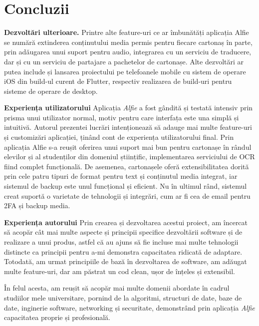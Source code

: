\chapter{Concluzii}

\textbf{Dezvoltări ulterioare.} Printre alte feature-uri ce ar îmbunătăți aplicația Alfie se numără extinderea conținutului media permis pentru fiecare cartonaș în parte, prin adăugarea unui suport pentru audio, integrarea cu un serviciu de traducere, dar și cu un serviciu de partajare a pachetelor de cartonașe. Alte dezvoltări ar putea include și lansarea proiectului pe telefoanele mobile cu sistem de operare iOS din build-ul curent de Flutter, respectiv realizarea de build-uri pentru sisteme de operare de desktop.

\textbf{Experiența utilizatorului} Aplicația \textit{Alfie} a fost gândită și testată intensiv prin prisma unui utilizator normal, motiv pentru care interfața este una simplă și intuitivă. Autorul prezentei lucrări intenționează să adauge mai multe feature-uri și customizări aplicației, ținând cont de experiența utilizatorului final. Prin aplicația Alfie s-a reușit oferirea unui suport mai bun pentru cartonașe în rândul elevilor și al studenților din domeniul științific, implementarea serviciului de OCR fiind complet funcțională. De asemenea, cartonașele oferă extensibilitatea dorită prin cele patru tipuri de format pentru text și conținutul media integrat, iar sistemul de backup este unul funcțional și eficient. Nu în ultimul rând, sistemul creat suportă o varietate de tehnologii și integrări, cum ar fi cea de email pentru 2FA și backup media.

\textbf{Experiența autorului} Prin crearea și dezvoltarea acestui proiect, am încercat să acopăr cât mai multe aspecte și principii specifice dezvoltării software și de realizare a unui produs, astfel că au ajuns să fie incluse mai multe tehnologii distincte ca principii pentru a-mi demonstra capacitatea ridicată de adaptare. Totodată, am urmat principiile de bază în dezvoltarea de software, am adăugat multe feature-uri, dar am păstrat un cod clean, ușor de înțeles și extensibil.

În felul acesta, am reușit să acopăr mai multe domenii abordate în cadrul studiilor mele universitare, pornind de la algoritmi, structuri de date, baze de date, inginerie software, networking și securitate, demonstrând prin aplicația \textit{Alfie} capacitatea proprie și profesională.
